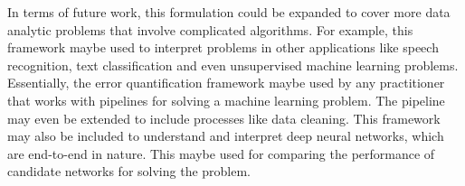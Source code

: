 In terms of future work, this formulation could be expanded to cover more data analytic problems that involve complicated algorithms. For example, this framework maybe used to interpret problems in other applications like speech recognition, text classification and even unsupervised machine learning problems. Essentially, the error quantification framework maybe used by any practitioner that works with pipelines for solving a machine learning problem. The pipeline may even be extended to include processes like data cleaning. This framework may also be included to understand and interpret deep neural networks, which are end-to-end in nature. This maybe used for comparing the performance of candidate networks for solving the problem.


\label{sec5}
